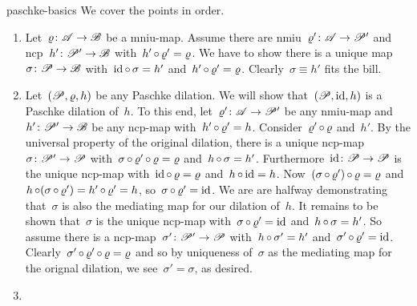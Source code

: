 \begin{solution}{paschke-basics}%
We cover the points in order.
\begin{enumerate}
\item
Let~$\varrho \colon \mathscr{A} \to \mathscr{B}$ be a mniu-map.
Assume there are nmiu~$\varrho'\colon \mathscr{A} \to \mathscr{P}'$
    and ncp~$h'\colon \mathscr{P}' \to \mathscr{B}$
        with~$h' \mathop{\circ} \varrho' = \varrho$.
We have to show there is a unique map~$\sigma\colon \mathscr{P} \to \mathscr{B}$
    with~$\mathrm{id} \mathop{\circ} \sigma= h'$ and~$h' \mathop{\circ} \varrho' = \varrho$.
        Clearly~$\sigma\equiv h' $ fits the bill.

\item
Let~$(\mathscr{P},\varrho,h)$ be any Paschke dilation.
        We will show that~$(\mathscr{P}, \mathrm{id}, h)$ is a Paschke dilation of~$h$.
To this end, let~$\varrho'\colon \mathscr{A} \to \mathscr{P}'$
        be any nmiu-map and~$h'\colon \mathscr{P}' \to \mathscr{B}$
        be any ncp-map with~$h' \mathop{\circ} \varrho' = h$.
Consider~$\varrho' \mathop{\circ} \varrho$ and~$h'$.
    By the universal property of the original dilation,
            there is a unique ncp-map~$\sigma \colon \mathscr{P}' \to \mathscr{P}$
                with~$\sigma\mathop{\circ}\varrho'\mathop{\circ}\varrho = \varrho$
                and~$h \mathop{\circ}\sigma = h'$.
Furthermore~$\mathrm{id}\colon \mathscr{P} \to \mathscr{P}$
    is the unique ncp-map
        with~$\mathrm{id} \mathop{\circ} \varrho = \varrho$
        and~$h \mathop{\circ} \mathrm{id} = h$.
Now~$(\sigma \mathop{\circ} \varrho') \mathop{\circ} \varrho = \varrho$
    and~$h \mathop{\circ} (\sigma \mathop{\circ} \varrho') = h' \mathop{\circ} \varrho' = h$,
        so~$\sigma \mathop{\circ} \varrho' = \mathrm{id}$.
We are are halfway demonstrating that~$\sigma$ is also the mediating map
        for our dilation of~$h$.
It remains to be shown that~$\sigma$ is the unique ncp-map
    with~$\sigma \mathop{\circ} \varrho' = \mathrm{id}$
        and~$h \mathop{\circ} \sigma = h'$.
So assume there is a ncp-map~$\sigma'\colon \mathscr{P}' \to \mathscr{P}$
    with~$h \mathop{\circ} \sigma' = h'$ and~$\sigma' \mathop{\circ} \varrho' = \mathrm{id}$.
    Clearly~$\sigma' \mathop{\circ}\varrho' \mathop{\circ}\varrho =\varrho$
        and so by uniqueness of~$\sigma$ as the mediating map
        for the orignal dilation,
        we see~$\sigma' = \sigma$, as desired.
    \item


\end{enumerate}
\end{solution}
